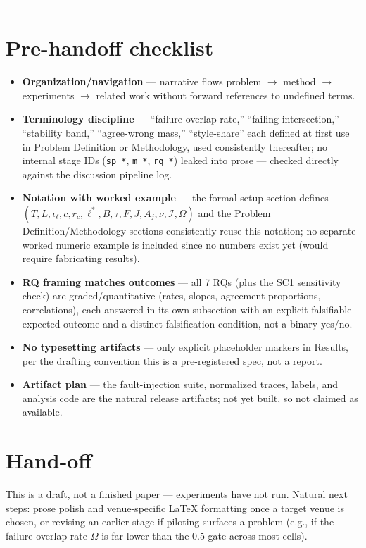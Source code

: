 \documentclass[11pt]{article}
\begin{document}



\vspace{1em}
\hrule
\vspace{1em}

\section*{Pre-handoff checklist}
\begin{itemize}[leftmargin=1.4em]
\item \textbf{Organization/navigation} --- narrative flows problem $\to$ method $\to$ experiments $\to$ related work without forward references to undefined terms.
\item \textbf{Terminology discipline} --- ``failure-overlap rate,'' ``failing intersection,'' ``stability band,'' ``agree-wrong mass,'' ``style-share'' each defined at first use in Problem Definition or Methodology, used consistently thereafter; no internal stage IDs (\texttt{sp\_*}, \texttt{m\_*}, \texttt{rq\_*}) leaked into prose --- checked directly against the discussion pipeline log.
\item \textbf{Notation with worked example} --- the formal setup section defines $(T, L, \iota_\ell, c, r_c, \ell^*, B, \tau, F, J, A_j, \nu, \mathcal{I}, \Omega)$ and the Problem Definition/Methodology sections consistently reuse this notation; no separate worked numeric example is included since no numbers exist yet (would require fabricating results).
\item \textbf{RQ framing matches outcomes} --- all 7 RQs (plus the SC1 sensitivity check) are graded/quantitative (rates, slopes, agreement proportions, correlations), each answered in its own subsection with an explicit falsifiable expected outcome and a distinct falsification condition, not a binary yes/no.
\item \textbf{No typesetting artifacts} --- only explicit placeholder markers in Results, per the drafting convention this is a pre-registered spec, not a report.
\item \textbf{Artifact plan} --- the fault-injection suite, normalized traces, labels, and analysis code are the natural release artifacts; not yet built, so not claimed as available.
\end{itemize}

\section*{Hand-off}
This is a draft, not a finished paper --- experiments have not run. Natural next steps: prose polish and venue-specific LaTeX formatting once a target venue is chosen, or revising an earlier stage if piloting surfaces a problem (e.g., if the failure-overlap rate $\Omega$ is far lower than the 0.5 gate across most cells).
\end{document}
